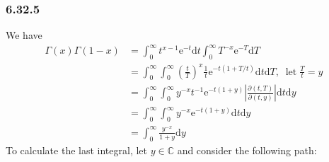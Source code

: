 \documentclass[]{ctexart}
\begin{document}
	\subsubsection*{6.32.5}
	We have 
	\begin{equation*}
	\begin{split}
	\Gamma(x)\Gamma(1-x)&=\int_0^\infty t^{x-1}\mathrm{e}^{-t}\mathrm{d}t\int_0^\infty T^{-x}\mathrm{e}^{-T}\mathrm{d}T\\
	&=\int_0^\infty\int_0^\infty\left(\frac{t}{T}\right)^x\frac 1t\mathrm{e}^{-t(1+T/t)}\mathrm{d}t\mathrm{d}T,\;\;\text{let}\;\frac Tt=y\\
	&=\int_0^\infty\int_0^\infty y^{-x}t^{-1}\mathrm{e}^{-t(1+y)}\left|\frac{\partial(t,T)}{\partial(t,y)}\right|\mathrm{d}t\mathrm{d}y\\
	&=\int_0^\infty\int_0^\infty y^{-x}\mathrm{e}^{-t(1+y)}\mathrm{d}t\mathrm{d}y\\
	&=\int_0^\infty\frac{y^{-x}}{1+y}\mathrm{d}y
	\end{split}
	\end{equation*}
	To calculate the last integral, let $y\in\mathbb C$ and consider the following path: 
\end{document}
